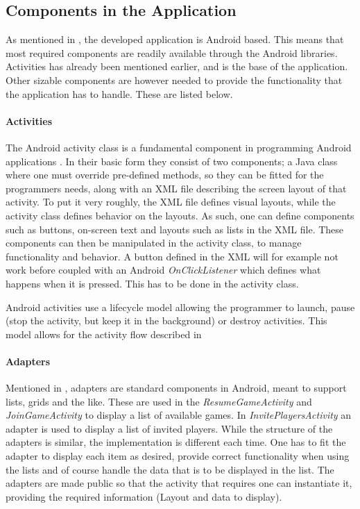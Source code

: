 \subsection{Components in the Application} \label{subsec:components}
As mentioned in , the developed application is Android based. This means that most required components are readily available through the Android libraries. Activities has already been mentioned earlier, and is the base of the application. Other sizable components are however needed to provide the functionality that the application has to handle. These are listed below.

\paragraph{Activities}
The Android activity class is a fundamental component in programming Android applications \cite{android-activity}. In their basic form they consist of two components; a Java class where one must override pre-defined methods, so they can be fitted for the programmers needs, along with an XML file describing the screen layout of that activity. To put it very roughly, the XML file defines visual layouts, while the activity class defines behavior on the layouts. As such, one can define components such as buttons, on-screen text and layouts such as lists in the XML file. These components can then be manipulated in the activity class, to manage functionality and behavior. A button defined in the XML will for example not work before coupled with an Android \textit{OnClickListener} which defines what happens when it is pressed. This has to be done in the activity class.

Android activities use a lifecycle model allowing the programmer to launch, pause (stop the activity, but keep it in the background) or destroy activities. This model allows for the activity flow described in 

\paragraph{Adapters}
Mentioned in , adapters are standard components in Android, meant to support lists, grids and the like. These are used in the \textit{ResumeGameActivity} and \textit{JoinGameActivity} to display a list of available games. In \textit{InvitePlayersActivity} an adapter is used to display a list of invited players. While the structure of the adapters is similar, the implementation is different each time. One has to fit the adapter to display each item as desired, provide correct functionality when using the lists and of course handle the data that is to be displayed in the list. The adapters are made public so that the activity that requires one can instantiate it, providing the required information (Layout and data to display).

